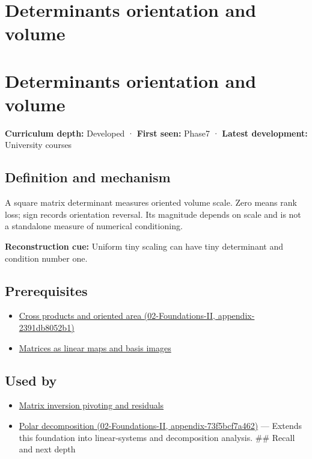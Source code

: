 \hypertarget{appendix-da478be01d02}{}
\section*{Determinants orientation and volume}
\section{Determinants orientation and volume}\label{determinants-orientation-and-volume}

\textbf{Curriculum depth:} Developed · \textbf{First seen:} Phase7 · \textbf{Latest development:} University courses

\subsection{Definition and mechanism}\label{definition-and-mechanism}

A square matrix determinant measures oriented volume scale. Zero means rank loss; sign records orientation reversal. Its magnitude depends on scale and is not a standalone measure of numerical conditioning.

\textbf{Reconstruction cue:} Uniform tiny scaling can have tiny determinant and condition number one.

\subsection{Prerequisites}\label{prerequisites}

\begin{itemize}
\tightlist
\item
  \href{}{Cross products and oriented area (02-Foundations-II, appendix-2391db8052b1)}
\item
  \hyperref[appendix-bd39c3bf5d64]{Matrices as linear maps and basis images}
\end{itemize}

\subsection{Used by}\label{used-by}

\begin{itemize}
\tightlist
\item
  \hyperref[appendix-48d2e66378ab]{Matrix inversion pivoting and residuals}
\item
  \href{}{Polar decomposition (02-Foundations-II, appendix-73f5bcf7a462)} --- Extends this foundation into linear-systems and decomposition analysis. \#\# Recall and next depth
\end{itemize}

